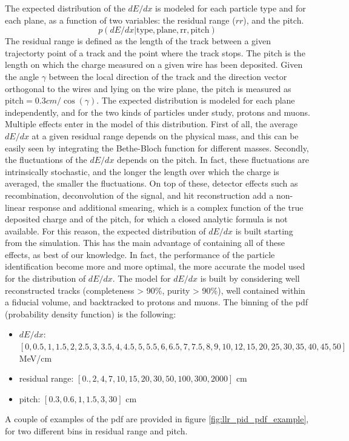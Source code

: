 \documentclass[a4paper]{article}
\begin{document}
The expected distribution of the $dE/dx$ is modeled for each particle type and for each plane, as a function of two variables: the residual range ($rr$), and the pitch.
\[ p(dE/dx | \text{type}, \text{plane}, \text{rr}, \text{pitch}) \]
The residual range is defined as the length of the track between a given trajectorty point of a track and the point where the track stops.
The pitch is the length on which the charge measured on a given wire has been deposited.
Given the angle $\gamma$ between the local direction of the track and the direction vector orthogonal to the wires and lying on the wire plane, the pitch is measured as $\text{pitch} = 0.3 cm / \cos(\gamma) $.
The expected distribution is modeled for each plane independently, and for the two kinds of particles under study, protons and muons.
Multiple effects enter in the model of this distribution.
First of all, the average $dE/dx$ at a given residual range depends on the physical mass, and this can be easily seen by integrating the Bethe-Bloch function for different masses.
Secondly, the fluctuations of the $dE/dx$ depends on the pitch.
In fact, these fluctuations are intrinsically stochastic, and the longer the length over which the charge is averaged, the smaller the fluctuations.
On top of these, detector effects such as recombination, deconvolution of the signal, and hit reconstruction add a non-linear response and additional smearing, which is a complex function of the true deposited charge and of the pitch, for which a closed analytic formula is not available.
For this reason, the expected distribution of $dE/dx$ is built starting from the simulation.
This has the main advantage of containing all of these effects, as best of our knowledge.
In fact, the performance of the particle identification become more and more optimal, the more accurate the model used for the distribution of $dE/dx$.
The model for $dE/dx$ is built by considering well reconstructed tracks (completeness > 90\%, purity > 90\%), well contained within a fiducial volume, and backtracked to protons and muons.
The binning of the pdf (probability density function) is the following:
\begin{itemize}
    \item $dE/dx$: $[0, 0.5, 1, 1.5, 2, 2.5, 3, 3.5, 4, 4.5, 5, 5.5, 6, 6.5, 7, 7.5, 8, 9, 10, 12, 15, 20, 25, 30, 35, 40, 45, 50]$ MeV/cm
    \item residual range: $[0., 2, 4, 7, 10, 15, 20, 30, 50, 100, 300, 2000]$ cm
    \item pitch: $[0.3, 0.6, 1, 1.5, 3, 30]$ cm
\end{itemize}
A couple of examples of the pdf are provided in figure \ref{fig:llr_pid_pdf_example}, for two different bins in residual range and pitch.
\end{document}

